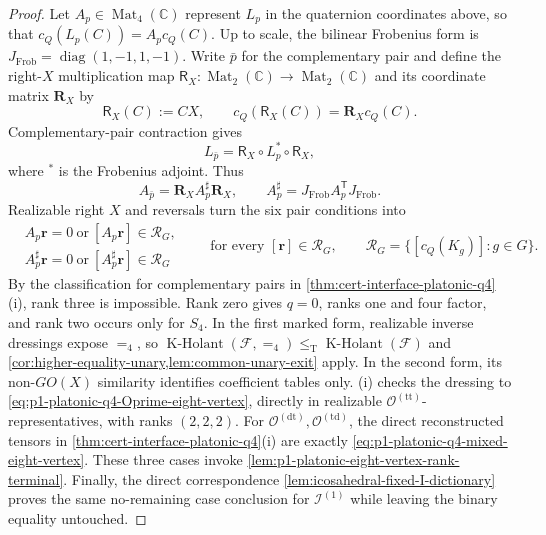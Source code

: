 \documentclass[11pt,letterpaper,onecolumn]{article}
\theoremstyle{plain}
\theoremstyle{definition}
\theoremstyle{remark}
\newcommand{\cF}{\mathcal F}
\newcommand{\KHolant}{\operatorname{K\text{-}Holant}}
\newcommand{\OctTT}{{\mathcal O^{(\mathrm{tt})}}}
\newcommand{\OctDT}{{\mathcal O^{(\mathrm{dt})}}}
\newcommand{\OctTD}{{\mathcal O^{(\mathrm{td})}}}
\newcommand{\IcoOne}{{\mathcal I^{(1)}}}
\newcommand{\Mat}{\operatorname{Mat}}
\newcommand{\diag}{\operatorname{diag}}
\newcommand{\Eq}{=}
\newcommand{\leT}{\leq_{\mathrm T}}
\begin{document}
\begin{proof}
Let \(A_p\in\Mat_4(\mathbb C)\) represent \(L_p\) in the quaternion
coordinates above, so that \(c_Q(L_p(C))=A_pc_Q(C)\).  Up to scale, the
bilinear Frobenius form is \(J_{\mathrm{Frob}}=\diag(1,-1,1,-1)\).
Write \(\bar p\) for the complementary pair and define the right-\(X\)
multiplication map \(\mathsf R_X:\Mat_2(\mathbb C)\to\Mat_2(\mathbb C)\) and
its coordinate matrix \(\mathbf R_X\) by
\[
 \mathsf R_X(C):=CX,\qquad
 c_Q(\mathsf R_X(C))=\mathbf R_Xc_Q(C).
\]
Complementary-pair contraction gives
\begin{equation}
  L_{\bar p}=\mathsf R_X\circ L_p^*\circ\mathsf R_X,
  \label{eq:platonic-q4-map-adjoint}
\end{equation}
where \(^*\) is the Frobenius adjoint.  Thus
\begin{equation}
  A_{\bar p}=\mathbf R_XA_p^\sharp\mathbf R_X,
  \qquad A_p^\sharp=J_{\mathrm{Frob}}A_p^{\mathsf T}J_{\mathrm{Frob}}.
  \label{eq:platonic-q4-adjoint}
\end{equation}
Realizable right \(X\) and reversals turn the six pair conditions into
\begin{equation*}
 \begin{aligned}
  &A_p{\mathbf{r}}=0\ \text{or}\ [A_p{\mathbf{r}}]\in\mathcal R_G,\\
  &A_p^\sharp {\mathbf{r}}=0\ \text{or}\ [A_p^\sharp {\mathbf{r}}]\in\mathcal R_G
 \end{aligned}
 \qquad\text{for every }[{\mathbf{r}}]\in\mathcal R_G,
 \qquad
 \mathcal R_G=\{[c_Q(K_g)]:g\in G\}.
\end{equation*}
By the classification for complementary pairs in
\cref{thm:cert-interface-platonic-q4}\textnormal{(i)}, rank three is impossible. Rank zero gives
\(q=0\), ranks one and four factor, and rank two occurs only for \(S_4\).
In the first marked form, realizable inverse dressings expose \(\Eq_4\), so
\(\KHolant(\cF,\Eq_4)\leT\KHolant(\cF)\) and
\cref{cor:higher-equality-unary,lem:common-unary-exit} apply.  In the second form, its non-\(GO(X)\)
similarity identifies coefficient tables only. \textnormal{(i)} checks
the dressing to \cref{eq:p1-platonic-q4-Oprime-eight-vertex}, directly in realizable
\(\OctTT\)-representatives, with ranks \((2,2,2)\).  For
\(\OctDT,\OctTD\), the direct reconstructed tensors in
\cref{thm:cert-interface-platonic-q4}\textnormal{(i)} are exactly
\cref{eq:p1-platonic-q4-mixed-eight-vertex}.  These three cases invoke
\cref{lem:p1-platonic-eight-vertex-rank-terminal}.  Finally, the direct
correspondence \cref{lem:icosahedral-fixed-I-dictionary} proves the same
no-remaining case conclusion for \(\IcoOne\) while leaving the binary equality untouched.
\end{proof}
\end{document}
